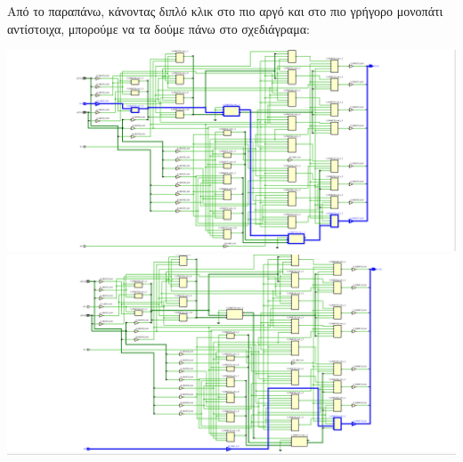 \documentclass[11pt, a4paper]{report}
\begin{document}
Από το παραπάνω, κάνοντας διπλό κλικ στο πιο αργό και στο πιο γρήγορο μονοπάτι αντίστοιχα, μπορούμε να τα δούμε πάνω στο σχεδιάγραμα:
\begin{center}
  \includegraphics[width=\textwidth]{./images/alu-1/Joe_Slowest_Path.png}
  \includegraphics[width=\textwidth]{./images/alu-1/Joe_Fastest_Path.png}
\end{center}
\end{document}
